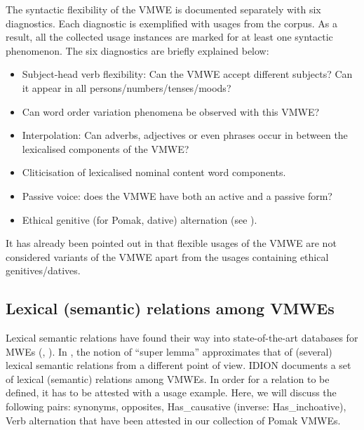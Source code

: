 \documentclass[output=paper,colorlinks,citecolor=brown]{langscibook}
\begin{document}
The syntactic flexibility of the VMWE is documented separately with six diagnostics. Each diagnostic is exemplified with usages from the corpus. As a result, all the collected usage instances are marked for at least one syntactic phenomenon.  The six diagnostics are  briefly explained below:
\begin{itemize}
\item Subject-head verb flexibility: Can the VMWE accept different subjects? Can it appear in all persons/numbers/tenses/moods?
\item Can word order variation phenomena be observed with this VMWE?
\item Interpolation: Can adverbs, adjectives or even phrases occur in between the lexicalised components of the VMWE?
\item Cliticisation of lexicalised nominal content word components.
\item Passive voice: does the VMWE have both an active and a passive form?
\item Ethical genitive (for Pomak, dative) alternation (see ).
\end{itemize}

It has already been pointed out in  that flexible usages of the VMWE are not considered variants of the VMWE apart from the usages containing ethical genitives/datives.

\subsection{Lexical (semantic) relations among VMWEs}
\label{sec:dessynonymy}

Lexical semantic relations have found their way into state-of-the-art databases for MWEs (,  ). In , the notion of ``super lemma'' approximates that of (several) lexical semantic relations from a different point of view. IDION documents a set of lexical (semantic) relations among VMWEs. In order for a relation to be defined, it has to be attested with a usage example. Here, we will discuss the following pairs: synonyms, opposites, Has\_causative (inverse: Has\_inchoative), Verb alternation that have been attested in our collection of Pomak VMWEs. 
\end{document}
